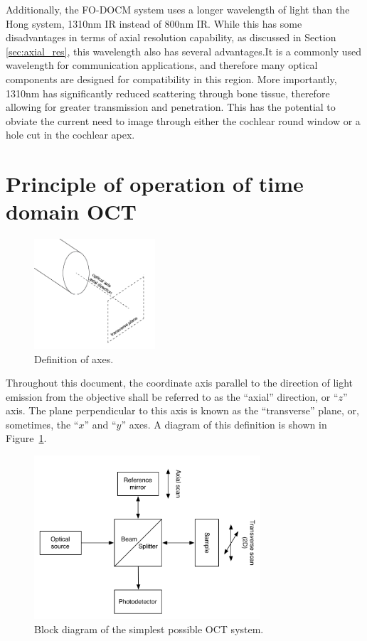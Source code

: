 Additionally, the FO-DOCM system uses a longer wavelength of light than the Hong system, 1310nm IR instead of 800nm IR. While this has some disadvantages in terms of axial resolution capability, as discussed in Section \ref{sec:axial_res}, this wavelength also has several advantages.It is a commonly used wavelength for communication applications, and therefore many optical components are designed for compatibility in this region. More importantly, 1310nm has significantly reduced scattering through bone tissue, therefore allowing for greater transmission and penetration. This has the potential to obviate the current need to image through either the cochlear round window or a hole cut in the cochlear apex. \cite{Sandell2011} \cite{Bashkatov2006}

\section{Principle of operation of time domain OCT}
\label{sec:principles_oct}

\begin{figure}[h!]
\centering
\includegraphics[width=0.4\textwidth]{Images/Background/axes.png}
\caption{Definition of axes.\label{fig:axis_def}}
\end{figure}

Throughout this document, the coordinate axis parallel to the direction of light emission from the objective shall be referred to as the ``axial'' direction, or ``$z$'' axis. The plane perpendicular to this axis is known as the ``transverse'' plane, or, sometimes, the ``$x$'' and ``$y$'' axes. A diagram of this definition is shown in Figure~\ref{fig:axis_def}.

\begin{figure}[h!]
  \centering
    \includegraphics[width=0.75\textwidth]{Images/Background/basic_oct_2.png}
      \caption{Block diagram of the simplest possible OCT system.\label{fig:basic_oct}}
\end{figure}

